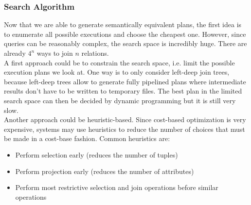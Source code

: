 \subsubsection{Search Algorithm}
Now that we are able to generate semantically equivalent plans, the first idea is to enumerate all possible executions and choose the cheapest one. However, since queries can be reasonably complex, the search space is incredibly huge. There are already $4^n$ ways to join $n$ relations.\\
A first approach could be to constrain the search space, i.e. limit the possible execution plans we look at. One way is to only consider left-deep join trees, because left-deep trees allow to generate fully pipelined plans where intermediate results don't have to be written to temporary files. The best plan in the limited search space can then be decided by dynamic programming but it is still very slow.\\
Another approach could be heuristic-based. Since cost-based optimization is very expensive, systems may use heuristics to reduce the number of choices that must be made in a cost-base fashion. Common heuristics are:
\begin{itemize}
\item Perform selection early (reduces the number of tuples)
\item Perform projection early (reduces the number of attributes)
\item Perform most restrictive selection and join operations before similar operations
\end{itemize}

